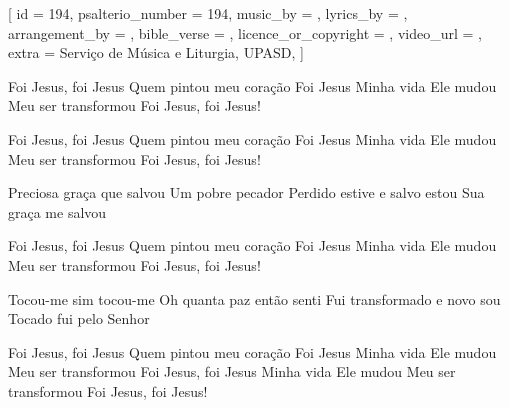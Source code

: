 [
    id                     = {194},
    psalterio_number       = {194},
    music_by               = {},
    lyrics_by              = {},
    arrangement_by         = {},
    bible_verse            = {},
    licence_or_copyright   = {},
    video_url              = {},
    extra                  = {Serviço de Música e Liturgia, UPASD},
]


\beginchorus
Foi Jesus, foi Jesus
Quem pintou meu coração
Foi Jesus
Minha vida Ele mudou
Meu ser transformou
Foi Jesus, foi Jesus!
\endchorus


\beginchorus
Foi Jesus, foi Jesus
Quem pintou meu coração
Foi Jesus
Minha vida Ele mudou
Meu ser transformou
Foi Jesus, foi Jesus!
\endchorus


\beginverse
Preciosa graça que salvou
Um pobre pecador
Perdido estive e salvo estou
Sua graça me salvou
\endverse




\beginchorus
Foi Jesus, foi Jesus
Quem pintou meu coração
Foi Jesus
Minha vida Ele mudou
Meu ser transformou
Foi Jesus, foi Jesus!
\endchorus


\beginverse
Tocou-me sim tocou-me
Oh quanta paz então senti
Fui transformado e novo sou
Tocado fui pelo Senhor
\endverse



\beginchorus
Foi Jesus, foi Jesus
Quem pintou meu coração
Foi Jesus
Minha vida Ele mudou
Meu ser transformou
Foi Jesus, foi Jesus
Minha vida Ele mudou
Meu ser transformou
Foi Jesus, foi Jesus!
\endchorus

\endsong
